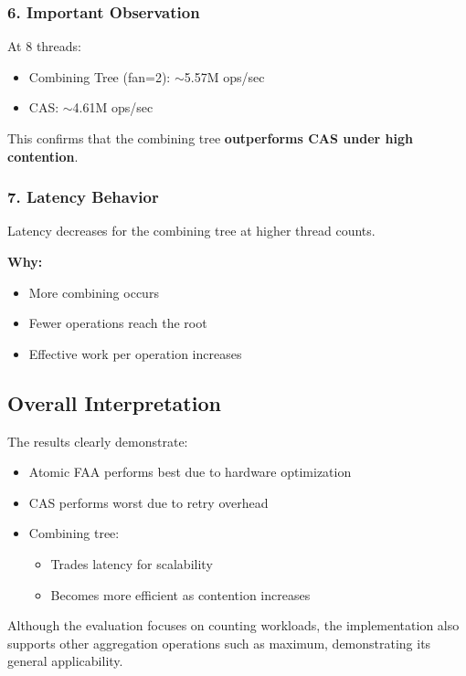 \documentclass[11pt,a4paper]{article}
\begin{document}
\subsubsection*{6. Important Observation}

At 8 threads:
\begin{itemize}
    \item Combining Tree (fan=2): $\sim$5.57M ops/sec
    \item CAS: $\sim$4.61M ops/sec
\end{itemize}
This confirms that the combining tree \textbf{outperforms CAS under high contention}.

\subsubsection*{7. Latency Behavior}

Latency decreases for the combining tree at higher thread counts.

\textbf{Why:}
\begin{itemize}
    \item More combining occurs
    \item Fewer operations reach the root
    \item Effective work per operation increases
\end{itemize}

\subsection{Overall Interpretation}

The results clearly demonstrate:
\begin{itemize}
    \item Atomic FAA performs best due to hardware optimization
    \item CAS performs worst due to retry overhead
    \item Combining tree:
    \begin{itemize}
        \item Trades latency for scalability
        \item Becomes more efficient as contention increases
    \end{itemize}
\end{itemize}
Although the evaluation focuses on counting workloads, the implementation also supports other aggregation operations such as maximum, demonstrating its general applicability. 
\end{document}
